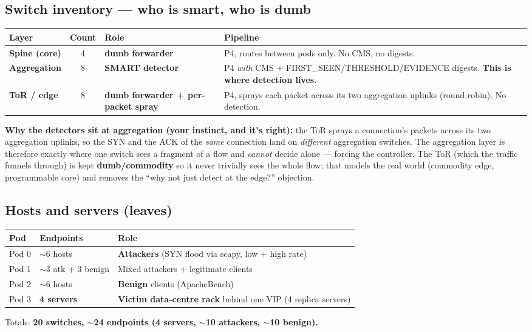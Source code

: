 \documentclass[11pt]{article}
\begin{document}
\subsection*{Switch inventory --- who is smart, who is dumb}
\begin{center}
\begin{tabular}{@{}p{2.4cm}cp{4.0cm}p{6.2cm}@{}}
\toprule
\textbf{Layer} & \textbf{Count} & \textbf{Role} & \textbf{Pipeline}\\
\midrule
\textbf{Spine (core)} & 4 & \textbf{dumb forwarder} & P4, routes between pods only. No CMS, no digests.\\
\textbf{Aggregation} & 8 & \textcolor{good}{\textbf{SMART detector}} & P4 \emph{with} CMS + FIRST\_SEEN/THRESHOLD/EVIDENCE digests. \textbf{This is where detection lives.}\\
\textbf{ToR / edge} & 8 & \textbf{dumb forwarder + per-packet spray} & P4, sprays each packet across its two aggregation uplinks (round-robin). No detection.\\
\bottomrule
\end{tabular}
\end{center}

\textbf{Why the detectors sit at aggregation (your instinct, and it's right):} the ToR sprays a
connection's packets across its two aggregation uplinks, so the SYN and the ACK of the \emph{same}
connection land on \emph{different} aggregation switches. The aggregation layer is therefore exactly where
one switch sees a fragment of a flow and \emph{cannot} decide alone --- forcing the controller. The ToR
(which the traffic funnels through) is kept \textbf{dumb/commodity} so it never trivially sees the whole
flow; that models the real world (commodity edge, programmable core) and removes the ``why not just detect
at the edge?'' objection.

\subsection*{Hosts and servers (leaves)}
\begin{center}
\begin{tabular}{@{}p{2.2cm}p{3.4cm}p{8.6cm}@{}}
\toprule
\textbf{Pod} & \textbf{Endpoints} & \textbf{Role}\\
\midrule
Pod 0 & $\sim$6 hosts & \textbf{Attackers} (SYN flood via scapy, low + high rate)\\
Pod 1 & $\sim$3 atk + 3 benign & Mixed attackers + legitimate clients\\
Pod 2 & $\sim$6 hosts & \textbf{Benign} clients (ApacheBench)\\
Pod 3 & \textbf{4 servers} & \textbf{Victim data-centre rack} behind one VIP (4 replica servers)\\
\bottomrule
\end{tabular}
\end{center}
Totals: \textbf{20 switches, $\sim$24 endpoints (4 servers, $\sim$10 attackers, $\sim$10 benign).}
\end{document}
